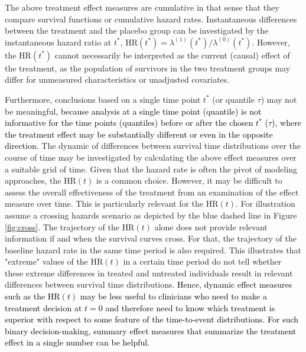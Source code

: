 \documentclass{article}
\newcommand{\NEW}[2][black]{\textcolor{#1}{#2}}
\begin{document}
\noindent The above treatment effect measures are cumulative in that sense that they compare survival functions or cumulative hazard rates.
Instantaneous differences between the treatment and the placebo group can be investigated by the instantaneous hazard ratio at $t^*$, $\text{HR}\left(t^*\right)={\lambda }^{(1)}(t^*)/{\lambda }^{\left(0\right)}(t^*)$.
However, the $\text{HR}(t^*)$ cannot necessarily be interpreted as the current (causal) effect of the treatment, as the population of survivors in the two treatment groups may differ for unmeasured characteristics or unadjusted covariates. 

\noindent 
Furthermore, conclusions based on a single time point $t^*$ (or quantile $\tau$) may not be meaningful\NEW{, because analysis at a single time point (quantile) is not informative for the time points (quantiles) before or after the chosen $t^*$ ($\tau$), where the treatment effect may be substantially different or even in the opposite direction.}%
\noindent The dynamic of differences between survival time distributions over the course of time may be investigated by calculating the above effect measures over a suitable grid of time. 
Given that the hazard rate is often the pivot of modeling approaches, the $\text{HR}(t)$ is a common choice. 
However, it may be difficult to assess the overall effectiveness of the treatment from an examination of the effect measure over time.
This is particularly relevant for the $\text{HR}(t)$.
For illustration assume a crossing hazards scenario as depicted by the blue dashed line in Figure \ref{fig:cross}. The trajectory of the $\text{HR}(t)$ alone does not provide relevant information if and when the survival curves cross. For that, the trajectory of the baseline hazard rate in the same time period is also required. 
This illustrates that "extreme" values of the $\text{HR}(t)$ in a certain time period do not tell whether these extreme differences in treated and untreated individuals 
result in relevant differences between survival time distributions.
\NEW{Hence, dynamic effect measures such as the $ \text{HR}(t) $ may be less useful to clinicians who need to make a treatment decision at $t=0$ and therefore need to know which treatment is superior with respect to some feature of the time-to-event distributions.
For such binary decision-making, summary effect measures that summarize the treatment effect in a single number can be helpful.} 
\end{document}
